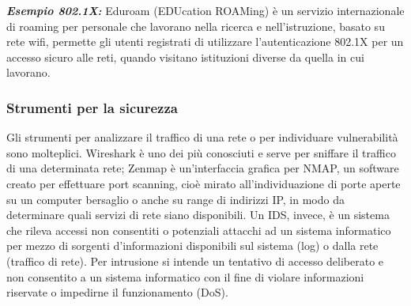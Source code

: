 \textit{\textbf{Esempio 802.1X:}} Eduroam (EDUcation ROAMing) è un servizio internazionale di roaming per personale che lavorano nella ricerca e nell'istruzione, basato su rete wifi, permette gli utenti registrati di utilizzare l'autenticazione 802.1X per un accesso sicuro alle reti, quando visitano istituzioni diverse da quella in cui lavorano.

\subsubsection{Strumenti per la sicurezza}
Gli strumenti per analizzare il traffico di una rete o per individuare vulnerabilità sono molteplici. Wireshark è uno dei più conosciuti e serve per sniffare il traffico di una determinata rete; Zenmap è un'interfaccia grafica per NMAP, un software creato per effettuare port scanning, cioè mirato all'individuazione di porte aperte su un computer bersaglio o anche su range di indirizzi IP, in modo da determinare quali servizi di rete siano disponibili. Un IDS, invece, è un sistema che rileva accessi non consentiti o potenziali attacchi ad un sistema informatico per mezzo di sorgenti d’informazioni disponibili sul sistema (log) o dalla rete (traffico di rete). Per intrusione si intende un tentativo di accesso deliberato e non consentito a un sistema informatico con il fine di violare informazioni riservate o impedirne il funzionamento (DoS).\\

